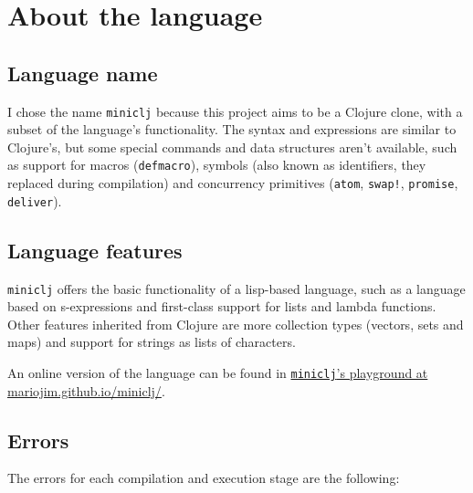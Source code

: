 \documentclass[11pt]{scrreprt}
\begin{document}
\chapter{About the language}
\section{Language name}
I chose the name \texttt{miniclj} because this project aims to be a Clojure clone, with a subset of the language's functionality. The syntax and expressions are similar to Clojure's, but some special commands and data structures aren't available, such as support for macros (\texttt{defmacro}), symbols (also known as identifiers, they replaced during compilation) and concurrency primitives (\texttt{atom}, \texttt{swap!}, \texttt{promise}, \texttt{deliver}).

\section{Language features}
\texttt{miniclj} offers the basic functionality of a lisp-based language, such as a language based on s-expressions and first-class support for lists and lambda functions. Other features inherited from Clojure are more collection types (vectors, sets and maps) and support for strings as lists of characters.

An online version of the language can be found in \href{https://mariojim.github.io/miniclj/}{\texttt{miniclj}'s playground at mariojim.github.io/miniclj/}.

\section{Errors}
The errors for each compilation and execution stage are the following:
\end{document}
